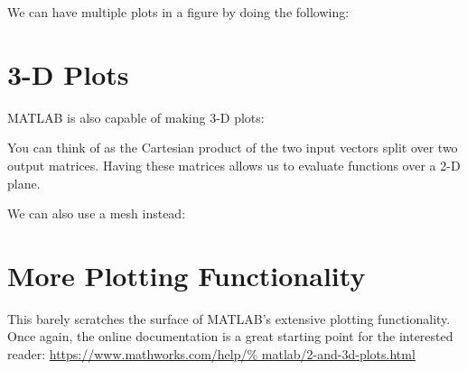 \documentclass{article}
\begin{document}
We can have multiple plots in a figure by doing the following:



\section{3-D Plots}

MATLAB is also capable of making 3-D plots:


You can think of  as the Cartesian product of the two input
vectors split over two output matrices.  Having these matrices allows us
to evaluate functions over a 2-D plane.

\newpage

We can also use a mesh instead:


\section{More Plotting Functionality}

This barely scratches the surface of MATLAB's extensive plotting
functionality.  Once again, the online documentation is a great starting
point for the interested reader: \url{https://www.mathworks.com/help/%
matlab/2-and-3d-plots.html}
\end{document}
